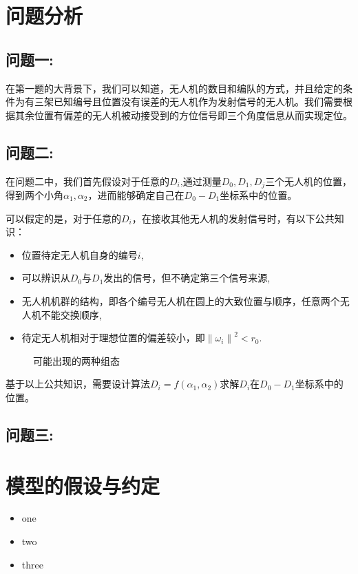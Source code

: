\documentclass[withoutpreface,bwprint]{cumcmthesis} %
\begin{document}
	\section{问题分析}
		\subsection{问题一:}
		在第一题的大背景下，我们可以知道，无人机的数目和编队的方式，并且给定的条件为有三架已知编号且位置没有误差的无人机作为发射信号的无人机。我们需要根据其余位置有偏差的无人机被动接受到的方位信号即三个角度信息从而实现定位。
		\subsection{问题二:}
		在问题二中，我们首先假设对于任意的$D_i$,通过测量$D_0,D_1,D_j$三个无人机的位置，得到两个小角$\alpha_1,\alpha_2$，进而能够确定自己在$D_0 - D_1$坐标系中的位置。
		
		可以假定的是，对于任意的$D_i$，在接收其他无人机的发射信号时，有以下公共知识：
		\begin{itemize}
			\item	位置待定无人机自身的编号$i$,
			\item	可以辨识从$D_0$与$D_1$发出的信号，但不确定第三个信号来源,
			\item	无人机机群的结构，即各个编号无人机在圆上的大致位置与顺序，任意两个无人机不能交换顺序,
			\item 	待定无人机相对于理想位置的偏差较小，即$ {\lVert \omega_i \rVert}^2 < r_0 $.
		\end{itemize}
		\begin{figure}[htb]
			\centering
			\caption{可能出现的两种组态}
			\label{fig1}
		\end{figure}
		基于以上公共知识，需要设计算法$D_i = f(\alpha_1, \alpha_2)$求解$D_i$在$D_0 - D_1$坐标系中的位置。
		\subsection{问题三:}
	\section{模型的假设与约定}
		\begin{itemize}
			\item{} one
			\item{} two
			\item{} three
		\end{itemize}
\end{document}
